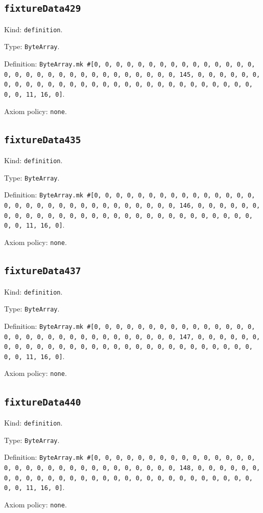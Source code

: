 \documentclass[11pt]{article}
\begin{document}
\subsection*{\texttt{fixtureData429}}
\noindent Kind: \texttt{definition}.\par
\noindent Type: \texttt{ByteArray}.\par
\noindent Definition: \texttt{ByteArray.mk \#[0, 0, 0, 0, 0, 0, 0, 0, 0, 0, 0, 0, 0, 0, 0, 0, 0, 0, 0, 0, 0, 0, 0, 0, 0, 0, 0, 0, 0, 0, 0, 145, 0, 0, 0, 0, 0, 0, 0, 0, 0, 0, 0, 0, 0, 0, 0, 0, 0, 0, 0, 0, 0, 0, 0, 0, 0, 0, 0, 0, 0, 0, 0, 11, 16, 0]}.\par
\noindent Axiom policy: \texttt{none}.\par
\subsection*{\texttt{fixtureData435}}
\noindent Kind: \texttt{definition}.\par
\noindent Type: \texttt{ByteArray}.\par
\noindent Definition: \texttt{ByteArray.mk \#[0, 0, 0, 0, 0, 0, 0, 0, 0, 0, 0, 0, 0, 0, 0, 0, 0, 0, 0, 0, 0, 0, 0, 0, 0, 0, 0, 0, 0, 0, 0, 146, 0, 0, 0, 0, 0, 0, 0, 0, 0, 0, 0, 0, 0, 0, 0, 0, 0, 0, 0, 0, 0, 0, 0, 0, 0, 0, 0, 0, 0, 0, 0, 11, 16, 0]}.\par
\noindent Axiom policy: \texttt{none}.\par
\subsection*{\texttt{fixtureData437}}
\noindent Kind: \texttt{definition}.\par
\noindent Type: \texttt{ByteArray}.\par
\noindent Definition: \texttt{ByteArray.mk \#[0, 0, 0, 0, 0, 0, 0, 0, 0, 0, 0, 0, 0, 0, 0, 0, 0, 0, 0, 0, 0, 0, 0, 0, 0, 0, 0, 0, 0, 0, 0, 147, 0, 0, 0, 0, 0, 0, 0, 0, 0, 0, 0, 0, 0, 0, 0, 0, 0, 0, 0, 0, 0, 0, 0, 0, 0, 0, 0, 0, 0, 0, 0, 11, 16, 0]}.\par
\noindent Axiom policy: \texttt{none}.\par
\subsection*{\texttt{fixtureData440}}
\noindent Kind: \texttt{definition}.\par
\noindent Type: \texttt{ByteArray}.\par
\noindent Definition: \texttt{ByteArray.mk \#[0, 0, 0, 0, 0, 0, 0, 0, 0, 0, 0, 0, 0, 0, 0, 0, 0, 0, 0, 0, 0, 0, 0, 0, 0, 0, 0, 0, 0, 0, 0, 148, 0, 0, 0, 0, 0, 0, 0, 0, 0, 0, 0, 0, 0, 0, 0, 0, 0, 0, 0, 0, 0, 0, 0, 0, 0, 0, 0, 0, 0, 0, 0, 11, 16, 0]}.\par
\noindent Axiom policy: \texttt{none}.\par
\end{document}
